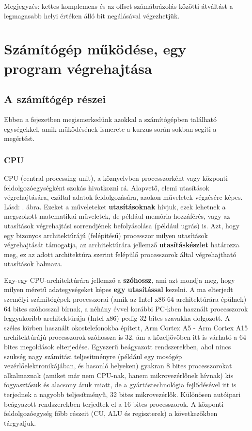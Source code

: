 Megjegyzés: kettes komplemens és az offset számábrázolás közötti átváltást a legmagasabb helyi értéken álló bit negálásával végezhetjük.

\section{Számítógép működése, egy program végrehajtása}
\label{szamitogep_alapok}

\subsection{A számítógép részei}
Ebben a fejezetben megismerkedünk azokkal a számítógépben található egységekkel, amik működésének ismerete a kurzus során sokban segíti a megértést.
 
\subsubsection{CPU}
CPU (central processing unit), a köznyelvben processzorként vagy központi feldolgozóegységként szokás hivatkozni rá. Alapvető, elemi utasítások végrehajtására, ezáltal adatok feldolgozására, azokon műveletek végzésére képes. Lásd: . ábra. Ezeket a műveleteket \textbf{utasításoknak} hívjuk, ezek lehetnek a megszokott matematikai műveletek, de például memória-hozzáférés, vagy az utasítások végrehajtási sorrendjének befolyásolása (például ugrás) is. Azt, hogy egy bizonyos architektúrájú (felépítésű) processzor milyen utasítások végrehajtását támogatja, az architektúrára jellemző \textbf{utasításkészlet} határozza meg, ez az adott architektúra szerint felépülő processzorok által végrehajtható utasítások halmaza.

Egy-egy CPU-architektúrára jellemző a \textbf{szóhossz}, ami azt mondja meg, hogy milyen méretű adategységeket képes \textbf{egy utasítással} kezelni. A ma elterjedt személyi számítógépek processzorai (amik az Intel x86-64 architektúrára épülnek) 64 bites szóhosszal bírnak, a néhány évvel korábbi PC-kben használt processzorok leggyakoribb architektúrája (Intel x86) pedig 32 bites szavakka dolgozott. A széles körben használt okostelefonokba épített, Arm Cortex A5 - Arm Cortex A15 architektúrájú processzorok szóhossza is 32, ám a közeljövőben itt is várható a 64 bites megoldások elterjedése. Egyszerű beágyazott rendszerekben, ahol nincs szükség nagy számítási teljesítményre (például egy mosógép vezérlőelektronikájában, és hasonló helyeken) gyakran 8 bites processzorokat alkalmaznak (amiket már nem CPU-nak, hanem mikrovezérlőnek hívnak) kis fogyasztásuk és alacsony áruk miatt, de a gyártástechnológia fejlődésével itt is terjednek a nagyobb teljesítményű, 32 bites mikrovezérlők. Különösen autóipari beágyazott rendszerekben terjedtek el a 16 bites processzorok. A központi feldolgozóegység főbb részeit (CU, ALU és regiszterek) a következőkben tárgyaljuk.

